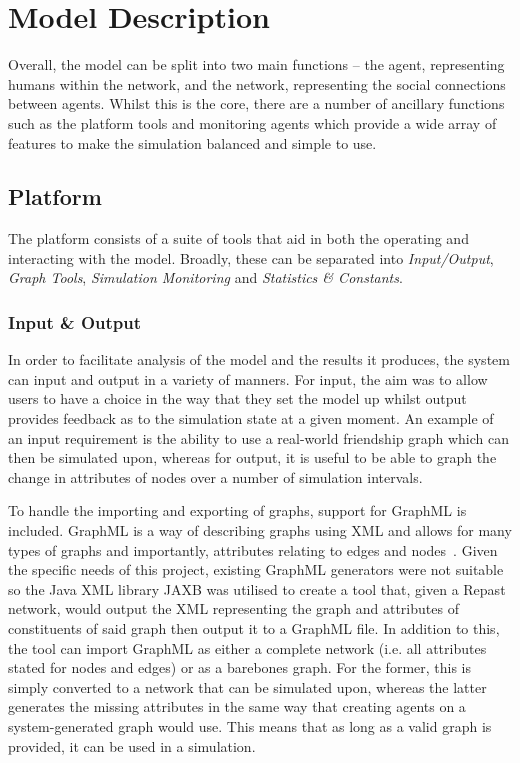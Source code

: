 \documentclass[]{report}
\begin{document}
\section{Model Description}
Overall, the model can be split into two main functions – the agent, representing humans within the network, and the network, representing the social connections between agents. Whilst this is the core, there are a number of ancillary functions such as the platform tools and monitoring agents which provide a wide array of features to make the simulation balanced and simple to use.

\subsection{Platform}
\label{sec:platform}
The platform consists of a suite of tools that aid in both the operating and interacting with the model. Broadly, these can be separated into \emph{Input/Output}, \emph{Graph Tools}, \emph{Simulation Monitoring} and \emph{Statistics \& Constants}.

\subsubsection{Input \& Output}
In order to facilitate analysis of the model and the results it produces, the system can input and output in a variety of manners. For input, the aim was to allow users to have a choice in the way that they set the model up whilst output provides feedback as to the simulation state at a given moment. An example of an input requirement is the ability to use a real-world friendship graph which can then be simulated upon, whereas for output, it is useful to be able to graph the change in attributes of nodes over a number of simulation intervals.

To handle the importing and exporting of graphs, support for GraphML is included. GraphML is a way of describing graphs using XML and allows for many types of graphs and importantly, attributes relating to edges and nodes~\cite{graphml}. Given the specific needs of this project, existing GraphML generators were not suitable so the Java XML library JAXB was utilised to create a tool that, given a Repast network, would output the XML representing the graph and attributes of constituents of said graph then output it to a GraphML file. In addition to this, the tool can import GraphML as either a complete network (i.e. all attributes stated for nodes and edges) or as a barebones graph. For the former, this is simply converted to a network that can be simulated upon, whereas the latter generates the missing attributes in the same way that creating agents on a system-generated graph would use. This means that as long as a valid graph is provided, it can be used in a simulation.
\end{document}
